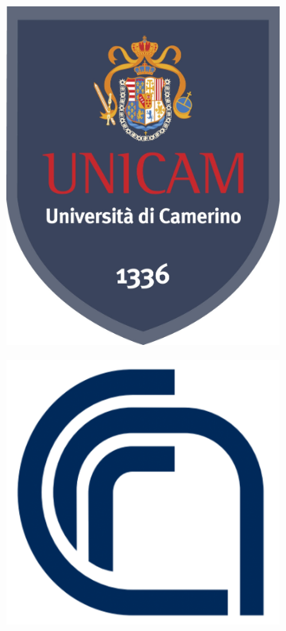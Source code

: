 \documentclass[11pt,oneside]{amsart}
\begin{document}
\begin{titlepage}
\begin{center}
\vspace{.3 cm}
%
\begin{figure}[htpb]
    \centering
    \begin{subfigure}{.2\textwidth}
        \centering
        \includegraphics[scale=.2]{unicam.jpg}
    \end{subfigure}%
    \begin{subfigure}{.2\textwidth}
        \centering
        \includegraphics[scale=.4]{CNR-INO logo.png}
    \end{subfigure}
\end{figure}
%
\vspace{.3 cm}


\end{center}
\end{titlepage}
\end{document}

